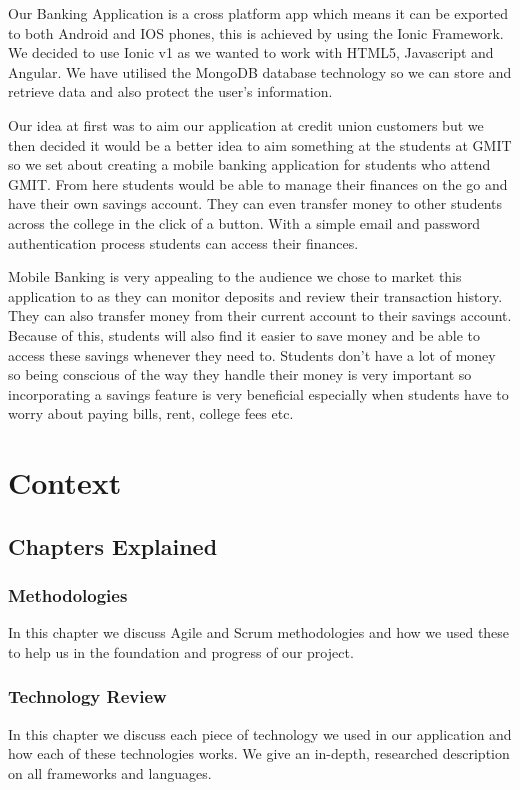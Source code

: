 	Our Banking Application is a cross platform app which means it can be exported to both
Android and IOS phones, this is achieved by using the Ionic Framework. We decided to use Ionic v1 as we wanted to work with HTML5, Javascript and Angular. We have utilised the MongoDB database technology so we can store and retrieve data and also protect the user’s information.

Our idea at first was to aim our application at credit union customers but we then decided it would be a better idea to aim something at the students at GMIT so we set about creating a mobile banking application for students who attend GMIT. From here students would be able to manage their finances on the go and have their own savings account. They can even transfer money to other students across the college in the click of a button. With a simple email and password authentication process students can access their finances.

Mobile Banking is very appealing to the audience we chose to market this application to as they can monitor deposits and review their transaction history. They can also transfer money from their current account to their savings account. Because of this, students will also find it easier to save money and be able to access these savings whenever they need to. Students don’t have a lot of money so being conscious of the way they handle their money is very important so incorporating a savings feature is very beneficial especially when students have to worry about paying bills, rent, college fees etc.





\chapter{Context}

\section{Chapters Explained}
\subsection{Methodologies}
In this chapter we discuss Agile and Scrum methodologies and how we used these to help us in the foundation and progress of our project.

\subsection{Technology Review}
In this chapter we discuss each piece of technology we used in our application and how each of these technologies works. We give an in-depth, researched description on all frameworks and languages.

